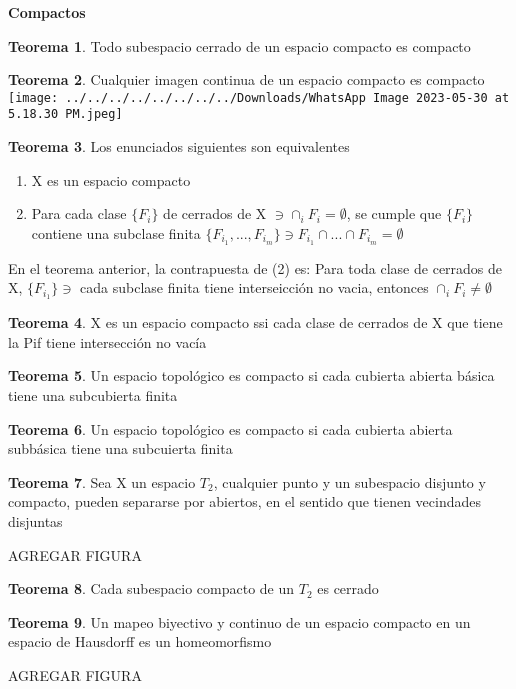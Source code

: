 \documentclass{article}
\theoremstyle{definition}
\newtheorem{theorem}{Teorema}[section]
\begin{document}
\textbf{Compactos}
\begin{theorem}
	Todo subespacio cerrado de un espacio compacto es compacto
\end{theorem}
\begin{theorem}
	Cualquier imagen continua de un espacio compacto es compacto\\
	\texttt{[image: ../../../../../../../../Downloads/WhatsApp Image 2023-05-30 at 5.18.30 PM.jpeg]} 
\end{theorem}
\begin{theorem}
	Los enunciados siguientes son equivalentes
	\begin{enumerate}
	\item X es un espacio compacto
	\item Para cada clase $\{F_i\}$ de cerrados de X $\ni\cap_iF_i=\emptyset$, se cumple que $\{F_i\}$ contiene una subclase finita $\{F_{i_1},...,F_{i_m}\}\ni F_{i_1}\cap ...\cap F_{i_m}=\emptyset$
\end{enumerate}
En el teorema anterior, la contrapuesta de (2) es: Para toda clase de cerrados de X, $\{F_{i_1}\}\ni$ cada subclase finita tiene interseicción no vacia, entonces $\cap_iF_i\neq\emptyset$ 
\end{theorem}
\begin{theorem}
	X es un espacio compacto ssi cada clase de cerrados de X que tiene la Pif tiene intersección no vacía
\end{theorem}
\begin{theorem}
	Un espacio topológico es compacto si cada cubierta abierta básica tiene una subcubierta finita
\end{theorem}
\begin{theorem}
	Un espacio topológico es compacto si cada cubierta abierta subbásica tiene una subcuierta finita
\end{theorem}
\begin{theorem}
	Sea X un espacio $T_2$, cualquier punto y un subespacio disjunto y compacto, pueden separarse por abiertos, en el sentido que tienen vecindades disjuntas
	
	AGREGAR FIGURA
\end{theorem}
\begin{theorem}
	Cada subespacio compacto de un $T_2$ es cerrado
\end{theorem}
\begin{theorem}
	Un mapeo biyectivo y continuo de un espacio compacto en un espacio de Hausdorff es un homeomorfismo
	
	AGREGAR FIGURA
\end{theorem}
\end{document}
